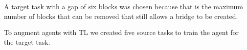 \documentclass{llncs}
\begin{document}
\noindent A target task with a gap of six blocks was chosen because that is the maximum number of blocks that can be removed that still allows a bridge to be created. 

To augment agents with TL we created five source tasks to train the agent for the target task.



\end{document}
